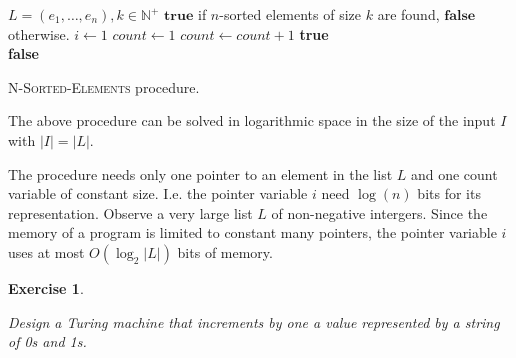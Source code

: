 \documentclass[11pt]{article}
\newtheorem{exercise}[theorem]{Exercise}
\begin{document}
\begin{algorithm}[ht]
\small
\begin{algorithmic}
	\Require $L=(e_{1},\ldots , e_{n}), k\in \mathbb{N}^{+}$
	\Ensure $\mathbf{true}$ if $n$-sorted elements of size $k$ are found, $\mathbf{false}$ otherwise.
	\newline
	\State $i \leftarrow 1$
	\State $count \leftarrow 1$  
				\State $count \leftarrow count + 1$
				\Return \textbf{true}
			\EndIf
		\EndIf
	\EndFor\\
	\Return \textbf{false}
\end{algorithmic}
\caption{\small \textsc{N-Sorted-Elements} procedure.}
\label{Alg-N-Sorted-El}
\end{algorithm}%

The above procedure can be solved in logarithmic space in the size of the
input $I$ with $|I|=|L|$.

The procedure needs only one pointer to an element in the list $L$ and one
count variable of constant size. I.e. the pointer variable $i$ need $\log (n)
$ bits for its representation. Observe a very large list $L$ of non-negative
intergers. Since the memory of a program is limited to constant many
pointers, the pointer variable $i$ uses at most $O(\log _{2}|L|)$ bits of
memory.

\bigskip

\begin{exercise}
\label{ex:turing}

Design a Turing machine that increments by one a value represented by a
string of 0s and 1s.
\end{exercise}
\end{document}

